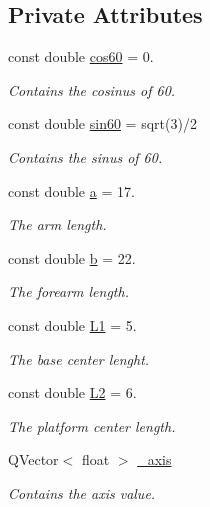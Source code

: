 \subsection*{Private Attributes}
\begin{DoxyCompactItemize}
\item 
const double \hyperlink{a00007_a86dc58ff23326f939cd6fb610ac90d53}{cos60} = 0.
\begin{DoxyCompactList}\small\item\em Contains the cosinus of 60. \end{DoxyCompactList}\item 
const double \hyperlink{a00007_aaa3e2dd194949b12f8a41ebd0d62fde9}{sin60} = sqrt(3)/2
\begin{DoxyCompactList}\small\item\em Contains the sinus of 60. \end{DoxyCompactList}\item 
const double \hyperlink{a00007_a7dc3998d380d61406fe4485f9872edff}{a} = 17.
\begin{DoxyCompactList}\small\item\em The arm length. \end{DoxyCompactList}\item 
const double \hyperlink{a00007_a14f03febaa39a60b9bf7ff9b9151060c}{b} = 22.
\begin{DoxyCompactList}\small\item\em The forearm length. \end{DoxyCompactList}\item 
const double \hyperlink{a00007_a6281142e50115dd8c914c14cfae6f90d}{L1} = 5.
\begin{DoxyCompactList}\small\item\em The base center lenght. \end{DoxyCompactList}\item 
const double \hyperlink{a00007_a3d51c16b1f498b48a6ecbfaadaba6ed2}{L2} = 6.
\begin{DoxyCompactList}\small\item\em The platform center length. \end{DoxyCompactList}\item 
Q\+Vector$<$ float $>$ \hyperlink{a00007_aad24ef961ee39dd35766c725c13b11b7}{\+\_\+axis}
\begin{DoxyCompactList}\small\item\em Contains the axis value. \end{DoxyCompactList}\item 

\end{DoxyCompactItemize}

